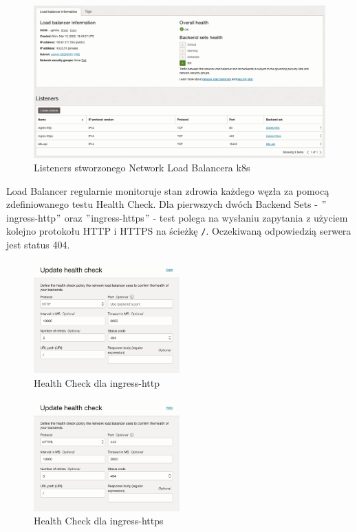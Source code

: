 \begin{figure}[H]
    \centering
    \includegraphics[width=\textwidth]{img/oci-network-load-balancer-k8s-listeners}
    \caption{Listeners stworzonego Network Load Balancera k8s}
    \label{fig:oci-network-load-balancer-k8s-listeners}
\end{figure}

Load Balancer regularnie monitoruje stan zdrowia każdego węzła za pomocą zdefiniowanego testu Health Check.
Dla pierwszych dwóch Backend Sets - \("\)ingress-http\("\) oraz \("\)ingress-https\("\) - test polega na wysłaniu zapytania z użyciem kolejno protokołu HTTP i HTTPS na ścieżkę \texttt{/}.
Oczekiwaną odpowiedzią serwera jest status 404.

\begin{multicols}{2}
    \begin{figure}[H]
        \centering
        \includegraphics[width=0.5\textwidth]{img/oci-network-load-balancer-ingress-http-health-check}
        \caption{Health Check dla ingress-http}
        \label{fig:oci-network-load-balancer-ingress-http-health-check}
    \end{figure}
    \begin{figure}[H]
        \centering
        \includegraphics[width=0.5\textwidth]{img/oci-network-load-balancer-ingress-https-health-check}
        \caption{Health Check dla ingress-https}
        \label{fig:oci-network-load-balancer-ingress-https-health-check}
    \end{figure}
\end{multicols}

